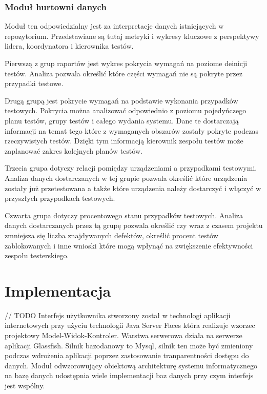 \subsection{ Moduł hurtowni danych  }

Moduł ten odpowiedzialny jest za interpretacje danych istniejących w repozytorium. Przedstawiane są tutaj metryki i wykresy kluczowe z perspektywy lidera, koordynatora i kierownika testów.

Pierwszą z grup raportów jest wykres pokrycia wymagań na poziome deinicji testów. Analiza pozwala określić które części wymagań nie są pokryte przez przypadki testowe.

Drugą grupą jest pokrycie wymagań na podstawie wykonania przypadków testowych. Pokrycia można analizować odpowiednio z poziomu pojedyńczego planu testów, grupy testów i całego wydania systemu. Dane te dostarczają informacji na temat tego które z wymaganych obszarów zostały pokryte podczas rzeczywistych testów. Dzięki tym informacją kierownik zespołu testów może zaplanować zakres kolejnych planów testów.

Trzecia grupa dotyczy relacji pomiędzy urządzeniami a przypadkami testowymi. Analiza danych dostarczanych w tej grupie pozwala określić które urządzenia zostały już przetestowana a także które urządzenia należy dostarczyć i włączyć w przyszłych przypadkach testowych.

Czwarta grupa dotyczy procentowego stanu przypadków testowych. Analiza danych dostarczanych przez tą grupę pozwala określić czy wraz z czasem projektu zmniejsza się liczba znajdywanych defektów, określić procent testów zablokowanych i inne wnioski które mogą wpłynąć na zwiększenie efektywności zespołu testerskiego.



\chapter{Implementacja}
// TODO
Interfejs użytkownika stworzony został w technologi aplikacji internetowych przy użyciu technologii Java Server Faces która realizuje wzorzec projektowy  Model-Widok-Kontroler. Warstwa serwerowa działa na serwerze aplikacji Glassfish. Silnik bazodanowy to Mysql, silnik ten może być zmieniony podczas wdrożenia aplikacji poprzez zastosowanie tranparentności dostępu do danych. Moduł odwzorowujący obiektową architekturę systemu informatycznego na bazę danych udostępnia wiele implementacji baz danych przy czym interfejs jest wspólny.

